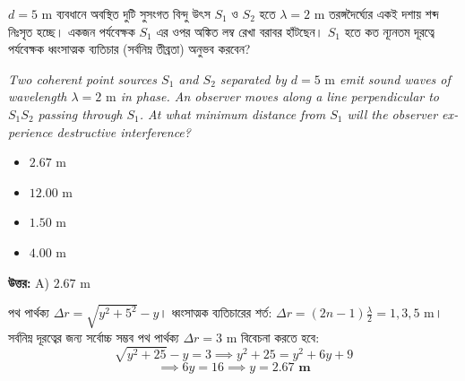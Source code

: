 \documentclass[12pt, a4paper]{article}
\begin{document}
\vspace{2em}

\begin{tcolorbox}[questionbox={প্রশ্ন (Question) 4}]
    \noindent
    $d = 5\text{ m}$ ব্যবধানে অবস্থিত দুটি সুসংগত বিন্দু উৎস $S_1$ ও $S_2$ হতে $\lambda = 2\text{ m}$ তরঙ্গদৈর্ঘ্যের একই দশায় শব্দ নিঃসৃত হচ্ছে। একজন পর্যবেক্ষক $S_1$ এর ওপর অঙ্কিত লম্ব রেখা বরাবর হাঁটছেন। $S_1$ হতে কত ন্যূনতম দূরত্বে পর্যবেক্ষক ধ্বংসাত্মক ব্যতিচার (সর্বনিম্ন তীব্রতা) অনুভব করবেন?
    
    \vspace{0.8em}
    \begin{english}
    \noindent\textit{\color{darkgray}
    Two coherent point sources $S_1$ and $S_2$ separated by $d = 5\text{ m}$ emit sound waves of wavelength $\lambda = 2\text{ m}$ in phase. An observer moves along a line perpendicular to $S_1 S_2$ passing through $S_1$. At what minimum distance from $S_1$ will the observer experience destructive interference?
    }
    \end{english}
\end{tcolorbox}

\begin{itemize}[label={}, leftmargin=1cm, itemsep=0.5em]
    \item[\textbf{A)}] $2.67\text{ m}$
    \item[\textbf{B)}] $12.00\text{ m}$
    \item[\textbf{C)}] $1.50\text{ m}$
    \item[\textbf{D)}] $4.00\text{ m}$
\end{itemize}

\vspace{0.5em}
\begin{tcolorbox}[answerbox]
    \textbf{\color{success} উত্তর:} A) $2.67\text{ m}$
\end{tcolorbox}
\vspace{1em}

\begin{tcolorbox}[solutionbox={সমাধান (Solution)}]
    \noindent
    পথ পার্থক্য $\Delta r = \sqrt{y^2 + 5^2} - y$। ধ্বংসাত্মক ব্যতিচারের শর্ত: $\Delta r = (2n - 1) \frac{\lambda}{2} = 1, 3, 5\text{ m}$। সর্বনিম্ন দূরত্বের জন্য সর্বোচ্চ সম্ভব পথ পার্থক্য $\Delta r = 3\text{ m}$ বিবেচনা করতে হবে:
    \[ \sqrt{y^2 + 25} - y = 3 \implies y^2 + 25 = y^2 + 6y + 9 \]
    \[ \implies 6y = 16 \implies y = \mathbf{2.67\text{ m}} \]
\end{tcolorbox}
\end{document}
